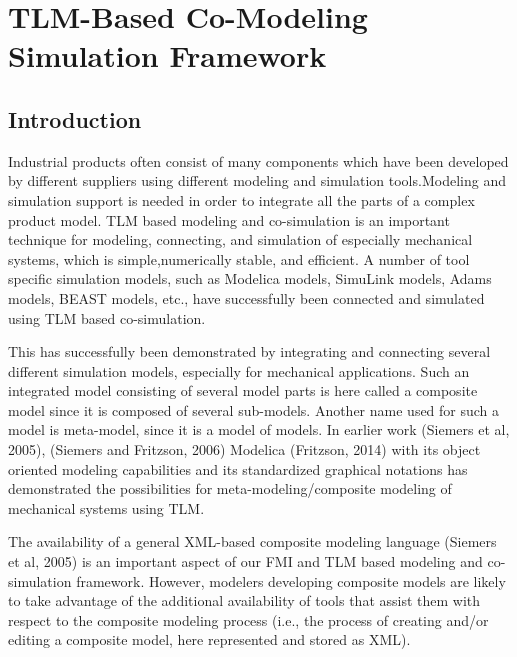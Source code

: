 

\chapter{TLM-Based Co-Modeling Simulation Framework}
\label{cha:tlm}


\section{Introduction}
\label{sec:tlmintroduction}

Industrial products often consist of many components which have been developed by different suppliers
using different modeling and simulation tools.Modeling and simulation support is needed in order to
integrate all the parts of a complex product model.
TLM based modeling and co-simulation is an important technique for modeling, connecting, and simulation of
especially mechanical systems, which is simple,numerically stable, and efficient. A number of tool specific
simulation models, such as Modelica models, SimuLink models, Adams models, BEAST models, etc., have successfully been connected
and simulated using TLM based co-simulation.

This has successfully been demonstrated by integrating and connecting several different simulation
models, especially for mechanical applications. Such an integrated model consisting of several model parts
is here called a composite model since it is composed of several sub-models. Another name used for such a
model is meta-model, since it is a model of models. In earlier work (Siemers et al, 2005), (Siemers and
Fritzson, 2006) Modelica (Fritzson, 2014) with its object oriented modeling capabilities and its
standardized graphical notations has demonstrated the possibilities for meta-modeling/composite modeling of
mechanical systems using TLM.

The availability of a general XML-based composite modeling language (Siemers et al, 2005) is an
important aspect of our FMI and TLM based modeling and co-simulation framework. However, modelers
developing composite models are likely to take advantage of the additional availability of tools that
assist them with respect to the composite modeling process (i.e., the process of creating and/or editing a
composite model, here represented and stored as XML). 

